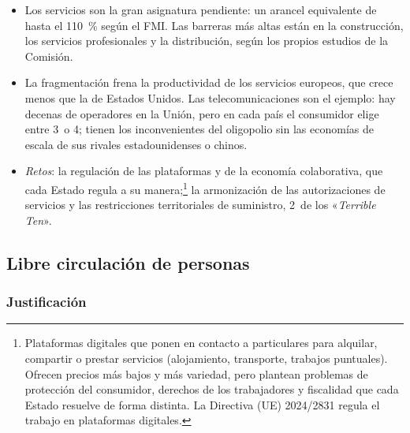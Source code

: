 \documentclass[11pt]{article}
\begin{document}
\begin{itemize}
\item[(--)] Los servicios son la gran asignatura pendiente: un arancel equivalente de hasta el 110~\% según el FMI\nocite{FMI2024REO}. Las barreras más altas están en la construcción, los servicios profesionales y la distribución, según los propios estudios de la Comisión.
\item[(--)] La fragmentación frena la productividad de los servicios europeos, que crece menos que la de Estados Unidos. Las telecomunicaciones son el ejemplo: hay decenas de operadores en la Unión, pero en cada país el consumidor elige entre 3~o 4; tienen los inconvenientes del oligopolio sin las economías de escala de sus rivales estadounidenses o chinos.
\item \emph{Retos}: la regulación de las plataformas y de la economía colaborativa, que cada Estado regula a su manera;\footnote{Plataformas digitales que ponen en contacto a particulares para alquilar, compartir o prestar servicios (alojamiento, transporte, trabajos puntuales). Ofrecen precios más bajos y más variedad, pero plantean problemas de protección del consumidor, derechos de los trabajadores y fiscalidad que cada Estado resuelve de forma distinta. La Directiva (UE) 2024/2831 regula el trabajo en plataformas digitales.} la armonización de las autorizaciones de servicios y las restricciones territoriales de suministro, 2~de los «\emph{Terrible Ten}».
\end{itemize}

\subsection{Libre circulación de personas}\label{sec:personas}

\subsubsection{Justificación}\label{sec:personas-justificacion}
\end{document}
